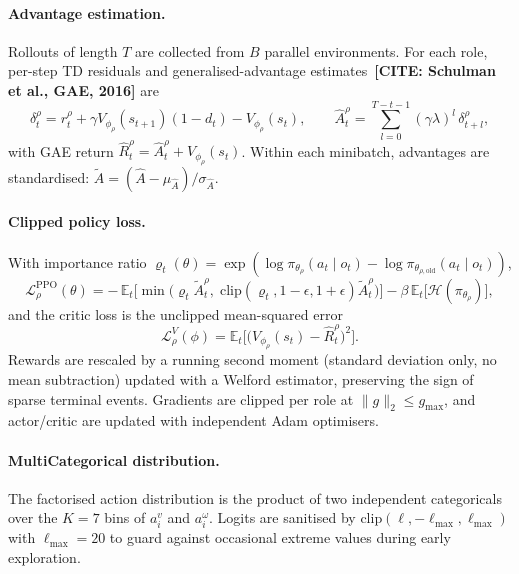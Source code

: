 \paragraph{Advantage estimation.}
Rollouts of length $T$ are collected from $B$ parallel environments. For each
role, per-step TD residuals and generalised-advantage
estimates~\textbf{[CITE: Schulman et al., GAE, 2016]} are
\begin{equation}
\delta_t^{\rho} = r_t^{\rho}
+ \gamma V_{\phi_\rho}(s_{t+1})(1-d_t) - V_{\phi_\rho}(s_t),
\qquad
\hat{A}_t^{\rho} = \sum_{l=0}^{T-t-1}(\gamma\lambda)^{l}\,\delta_{t+l}^{\rho},
\label{eq:gae}
\end{equation}
with GAE return $\hat{R}_t^{\rho}=\hat{A}_t^{\rho}+V_{\phi_\rho}(s_t)$.
Within each minibatch, advantages are standardised:
$\tilde{A}=(\hat{A}-\mu_{\hat A})/\sigma_{\hat A}$.

\paragraph{Clipped policy loss.}
With importance ratio
$\varrho_t(\theta)=\exp(\log\pi_{\theta_\rho}(a_t\mid o_t) - \log\pi_{\theta_{\rho,\mathrm{old}}}(a_t\mid o_t))$,
\begin{equation}
\mathcal{L}^{\mathrm{PPO}}_{\rho}(\theta)
= -\,\mathbb{E}_t\!\Big[\min\!\bigl(\varrho_t\tilde{A}_t^{\rho},\;
\mathrm{clip}(\varrho_t,1-\epsilon,1+\epsilon)\tilde{A}_t^{\rho}\bigr)\Big]
- \beta\,\mathbb{E}_t\!\bigl[\mathcal{H}(\pi_{\theta_\rho})\bigr],
\label{eq:ppo_loss}
\end{equation}
and the critic loss is the unclipped mean-squared error
\begin{equation}
\mathcal{L}^{V}_{\rho}(\phi)
= \mathbb{E}_t\!\Big[\bigl(V_{\phi_\rho}(s_t) - \hat{R}_t^{\rho}\bigr)^{2}\Big].
\label{eq:val_loss}
\end{equation}
Rewards are rescaled by a running second moment (standard deviation only, no
mean subtraction) updated with a Welford estimator, preserving the sign of
sparse terminal events. Gradients are clipped per role at
$\|g\|_2\le g_{\max}$, and actor/critic are updated with independent Adam
optimisers.

\paragraph{MultiCategorical distribution.}
The factorised action distribution is the product of two independent
categoricals over the $K=7$ bins of $a_i^{v}$ and $a_i^{\omega}$. Logits are
sanitised by $\mathrm{clip}(\ell,-\ell_{\max},\ell_{\max})$ with
$\ell_{\max}=20$ to guard against occasional extreme values during early
exploration.

